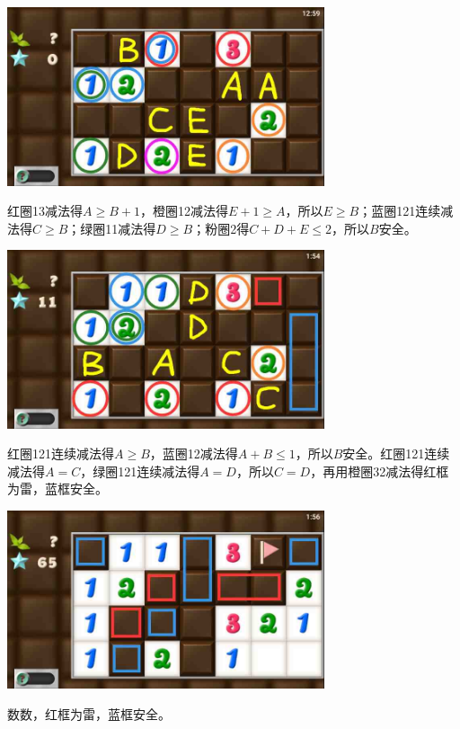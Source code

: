 \subsection{} %
\begin{center}
    \includegraphics[width=0.7\textwidth]{puzzlelow/227-1.jpg}
\end{center}
红圈13减法得$A\ge B+1$，橙圈12减法得$E+1\ge A$，所以$E\ge B$；蓝圈121连续减法得$C\ge B$；绿圈11减法得$D\ge B$；粉圈2得$C+D+E\le 2$，所以$B$安全。
\begin{center}
    \includegraphics[width=0.7\textwidth]{puzzlelow/227-2.jpg}
\end{center}
红圈121连续减法得$A\ge B$，蓝圈12减法得$A+B\le 1$，所以$B$安全。红圈121连续减法得$A=C$，绿圈121连续减法得$A=D$，所以$C=D$，再用橙圈32减法得红框为雷，蓝框安全。
\begin{center}
    \includegraphics[width=0.7\textwidth]{puzzlelow/227-3.jpg}
\end{center}
数数，红框为雷，蓝框安全。

